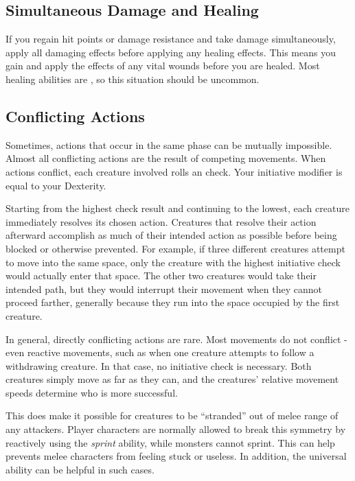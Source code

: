   \subsection{Simultaneous Damage and Healing}\label{Simultaneous Damage and Healing}
    If you regain hit points or damage resistance and take damage simultaneously, apply all damaging effects before applying any healing effects.
    This means you gain and apply the effects of any vital wounds before you are healed.
    Most healing abilities are , so this situation should be uncommon.

  \subsection{Conflicting Actions}\label{Conflicting Actions}
    Sometimes, actions that occur in the same phase can be mutually impossible.
    Almost all conflicting actions are the result of competing movements.
    When actions conflict, each creature involved rolls an  check.
    Your initiative modifier is equal to your Dexterity.

    Starting from the highest check result and continuing to the lowest, each creature immediately resolves its chosen action.
    Creatures that resolve their action afterward accomplish as much of their intended action as possible before being blocked or otherwise prevented.
    For example, if three different creatures attempt to move into the same space, only the creature with the highest initiative check would actually enter that space.
    The other two creatures would take their intended path, but they would interrupt their movement when they cannot proceed farther, generally because they run into the space occupied by the first creature.

    In general, directly conflicting actions are rare.
    Most movements do not conflict - even reactive movements, such as when one creature attempts to follow a withdrawing creature.
    In that case, no initiative check is necessary.
    Both creatures simply move as far as they can, and the creatures' relative movement speeds determine who is more successful.

    This does make it possible for creatures to be ``stranded'' out of melee range of any attackers.
    Player characters are normally allowed to break this symmetry by reactively using the \textit{sprint} ability, while monsters cannot sprint.
    This can help prevents melee characters from feeling stuck or useless.
    In addition, the  universal ability can be helpful in such cases.

